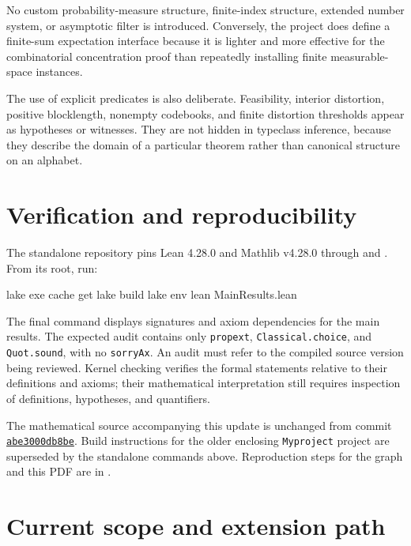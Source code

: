 \documentclass[11pt]{article}
\begin{document}
No custom probability-measure structure, finite-index structure, extended
number system, or asymptotic filter is introduced.  Conversely, the project
does define a finite-sum expectation interface because it is lighter and more
effective for the combinatorial concentration proof than repeatedly installing
finite measurable-space instances.

The use of explicit predicates is also deliberate.  Feasibility, interior
distortion, positive blocklength, nonempty codebooks, and finite distortion
thresholds appear as hypotheses or witnesses.  They are not hidden in
typeclass inference, because they describe the domain of a particular theorem
rather than canonical structure on an alphabet.

\section{Verification and reproducibility}

The standalone repository pins Lean 4.28.0 and Mathlib v4.28.0 through
 and . From its root, run:
\begin{LeanCode}
lake exe cache get
lake build
lake env lean MainResults.lean
\end{LeanCode}
The final command displays signatures and axiom dependencies for the main
results. The expected audit contains only \texttt{propext},
\texttt{Classical.choice}, and \texttt{Quot.sound}, with no
\texttt{sorry\allowbreak Ax}. An audit must refer to the compiled source version being
reviewed. Kernel checking verifies the formal statements relative to their
definitions and axioms; their mathematical interpretation still requires
inspection of definitions, hypotheses, and quantifiers.

The mathematical source accompanying this update is unchanged from commit
\href{https://github.com/fubinyan/rate_distortion_lean4/commit/abe3000db8beb77484fd8b082961d947dfa30050}{\texttt{abe3000db8be}}. Build instructions for the
older enclosing \texttt{Myproject} project are superseded by the standalone
commands above. Reproduction steps for the graph and this PDF are in
.

\section{Current scope and extension path}\label{sec:extensions}
\end{document}
